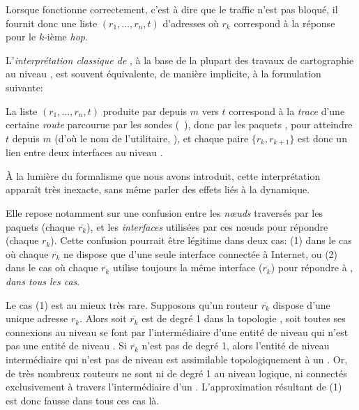 Lorsque \traceroute fonctionne correctement, c'est à dire que le traffic n'est
pas bloqué, il fournit donc une liste $(r_1, \ldots, r_n, t)$ d'adresses \ip où
$r_k$ correspond à la réponse pour le $k$-ième {\em hop}.

L'{\em interprétation classique de \traceroute}, à la base de la plupart des
travaux de cartographie au niveau \ip, est souvent équivalente, de manière
implicite, à la formulation suivante:

\begin{hypothese} La liste $(r_1,
\ldots, r_n, t)$ produite par \traceroute depuis $m$ vers $t$ correspond à la
{\em trace} d'une certaine {\em route} parcourue par les sondes
(\cf~), donc par les paquets \ip, pour atteindre $t$ depuis $m$
(d'où le nom de l'utilitaire, \traceroute), et chaque paire $\{r_k, r_{k+1}\}$
est donc un lien entre deux interfaces au niveau \LLL.
\label{hyp:traceroute-classique}
\end{hypothese}

À la lumière du formalisme que nous avons introduit, cette interprétation
apparaît très inexacte, sans même parler des effets liés à la dynamique. 

Elle repose notamment sur une confusion entre les {\em n\oe{}uds} \LLL traversés
par les paquets (chaque $\overline{r_k}$), et les {\em interfaces} utilisées par
ces n\oe{}uds pour répondre (chaque $r_k$).
Cette confusion pourrait être légitime dans deux cas: (1) dans le cas où chaque
$\overline{r_k}$ ne dispose que d'une seule interface connectée à Internet,
ou (2) dans le cas où chaque $\overline{r_k}$ utilise toujours la même
interface ($\overline{r_k}$) pour répondre à \traceroute, {\em dans tous les cas}.

Le cas (1) est au mieux très rare. Supposons qu'un routeur $\overline{r_k}$
dispose d'une unique adresse \ip $r_k$. Alors soit $\overline{r_k}$ est de degré
1 dans la topologie \LLL, soit toutes ses connexions au niveau \LLL se font par
l'intermédiaire d'une entité de niveau \LL qui n'est pas une entité de niveau
\LLL. Si $\overline{r_k}$ n'est pas de degré 1, alors l'entité de niveau \LL
intermédiaire qui n'est pas de niveau \LLL est assimilable topologiquement à un
\switch. Or, de très nombreux routeurs ne sont ni de degré 1 au niveau logique,
ni connectés exclusivement à travers l'intermédiaire d'un \switch.
L'approximation résultant de (1) est donc fausse dans tous ces cas là.

